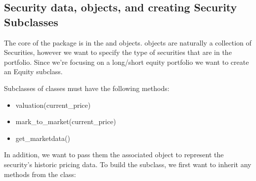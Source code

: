 \documentclass[letterpaper,10pt,english]{sphinxmanual}
\begin{document}
\subsection{Security data,  objects, and creating Security Subclasses}
\label{\detokenize{gettingstarted:security-data-security-objects-and-creating-security-subclasses}}
The core of the package is in the  and 
objects.  objects are naturally a collection of Securities,
however we want to specify the type of securities that are in the
portfolio. Since we’re focusing on a long/short equity portfolio we want
to create an Equity subclass.

Subclasses of  classes must have the following methods:
\begin{itemize}
\item {} 
valuation(current\_price)

\item {} 
mark\_to\_market(current\_price)

\item {} 
get\_marketdata()

\end{itemize}

In addition, we want to pass them the associated  object
to represent the security’s historic pricing data. To build the
 subclass, we first want to inherit any methods from the
 class:

%
\begin{sphinxVerbatim}[commandchars=\\\{\}]
 

     
              
          
          
          
          
            
          
          
\end{sphinxVerbatim}
\end{document}
